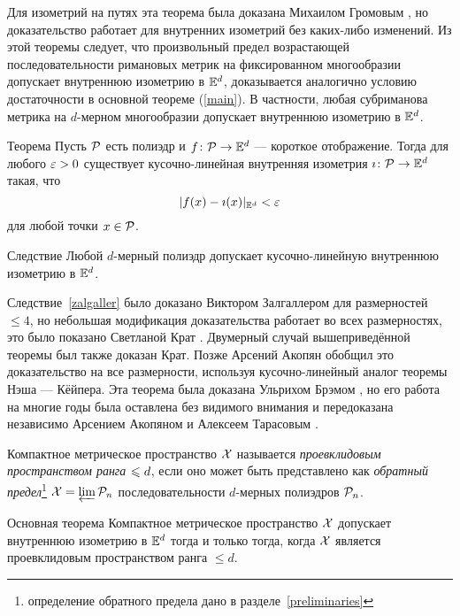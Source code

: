 \documentclass[oneside,a4paper]{article}
\begin{document}
Для изометрий на путях эта теорема была доказана Михаилом Громовым \cite[2.4.11]{gromov-PDE},
но доказательство работает для внутренних изометрий  без каких-либо изменений.
Из этой теоремы следует, что произвольный предел возрастающей последовательности римановых метрик на фиксированном многообразии допускает внутреннюю изометрию в $\mathbb{E}^d$,
доказывается аналогично условию достаточности в основной теореме (\ref{main}).
В частности, любая субриманова метрика на $d$-мерном многообразии допускает внутреннюю изометрию в $\mathbb{E}^d$.

\begin{thm}{Теорема}\label{PL-Nash}
Пусть $\mathcal{P}$ есть полиэдр и $f\colon \mathcal{P}\to\mathbb{E}^d$ --- короткое отображение.
Тогда для любого $\varepsilon>0$ существует кусочно-линейная внутренняя изометрия $\imath\colon \mathcal{P}\to \mathbb{E}^d$ 
такая, что
$$|f(x)-\imath(x)|_{\mathbb{E}^d}<\varepsilon$$
для любой точки $x\in \mathcal{P}$.
\end{thm}

\begin{thm}{Следствие}\label{zalgaller}
Любой $d$-мерный полиэдр допускает кусочно-линейную внутреннюю изометрию в $\mathbb{E}^d$.
\end{thm}

Следствие~\ref{zalgaller} было доказано Виктором Залгаллером \cite{zalgaller} для размерностей $\le 4$, 
но небольшая модификация доказательства работает во всех размерностях,
это было показано Светланой Крат \cite{krat}.
Двумерный случай вышеприведённой теоремы был также доказан Крат.
Позже Арсений Акопян \cite{akopjan} обобщил это доказательство на все размерности,
используя кусочно-линейный аналог теоремы Нэша --- Кёйпера.
Эта теорема была доказана Ульрихом Брэмом \cite{brehm},
но его работа на многие годы была оставлена без видимого внимания
и передоказана независимо Арсением Акопяном и Алексеем Тарасовым \cite{akopjan-tarasov}.





Компактное метрическое пространство $\mathcal{X}$ 
называется \emph{проевклидовым пространством ранга $\z\le d$},
если оно может быть представлено как  \emph{обратный предел}\footnote{определение обратного предела дано в  разделе~\ref{preliminaries}} $\mathcal{X}=\varprojlim \mathcal{P}_n$ 
последовательности $d$-мерных полиэдров $\mathcal{P}_n$.

\begin{thm}{Основная теорема}\label{main}
Компактное метрическое пространство $\mathcal{X}$ 
допускает внутреннюю изометрию в $\mathbb{E}^d$ тогда и только тогда, когда $\mathcal{X}$ является проевклидовым пространством  ранга $\le d$. 
\end{thm}
\end{document}
